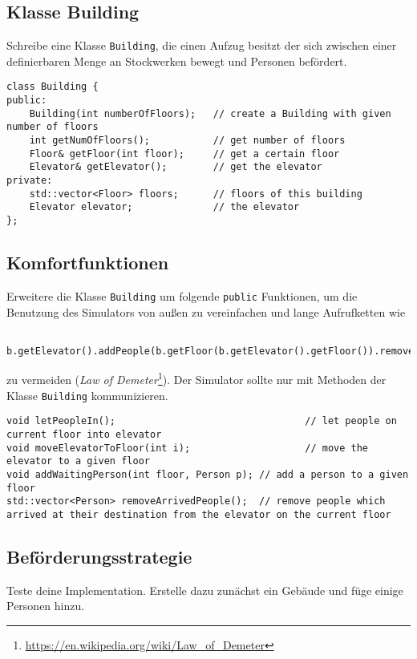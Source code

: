 \subsection{Klasse Building}
Schreibe eine Klasse \lstinline{Building}, die einen Aufzug besitzt der sich zwischen einer definierbaren Menge an Stockwerken bewegt und Personen befördert.

\begin{lstlisting}
class Building {
public:
    Building(int numberOfFloors);   // create a Building with given number of floors
    int getNumOfFloors();           // get number of floors
    Floor& getFloor(int floor);     // get a certain floor
    Elevator& getElevator();        // get the elevator
private:
    std::vector<Floor> floors;      // floors of this building
    Elevator elevator;              // the elevator
};
\end{lstlisting}


\subsection{Komfortfunktionen}
Erweitere die Klasse \lstinline{Building} um folgende \lstinline{public} Funktionen, um die Benutzung des Simulators von außen zu vereinfachen und lange Aufrufketten wie
\begin{lstlisting}
    b.getElevator().addPeople(b.getFloor(b.getElevator().getFloor()).removeAllPeople());
\end{lstlisting}

zu vermeiden (\emph{Law of Demeter}\footnote{\url{https://en.wikipedia.org/wiki/Law_of_Demeter}}).
Der Simulator sollte nur mit Methoden der Klasse \lstinline{Building} kommunizieren.

\begin{lstlisting}
void letPeopleIn();                                 // let people on current floor into elevator
void moveElevatorToFloor(int i);                    // move the elevator to a given floor
void addWaitingPerson(int floor, Person p); // add a person to a given floor
std::vector<Person> removeArrivedPeople();  // remove people which arrived at their destination from the elevator on the current floor
\end{lstlisting}

\subsection{Beförderungsstrategie}
Teste deine Implementation.
Erstelle dazu zunächst ein Gebäude und füge einige Personen hinzu.

